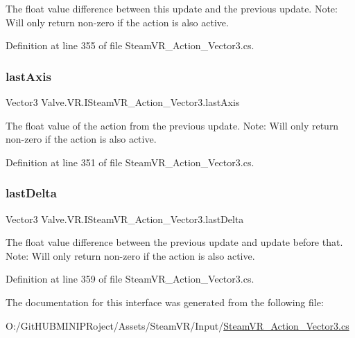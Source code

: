 The float value difference between this update and the previous update. Note\+: Will only return non-\/zero if the action is also active. 



Definition at line 355 of file Steam\+V\+R\+\_\+\+Action\+\_\+\+Vector3.\+cs.

\mbox{\label{interface_valve_1_1_v_r_1_1_i_steam_v_r___action___vector3_a9d3a8788967b30126be9b9482c4ded5f}} 
\subsubsection{\texorpdfstring{lastAxis}{lastAxis}}
{\footnotesize\ttfamily Vector3 Valve.\+V\+R.\+I\+Steam\+V\+R\+\_\+\+Action\+\_\+\+Vector3.\+last\+Axis\hspace{0.3cm}{\ttfamily [get]}}



The float value of the action from the previous update. Note\+: Will only return non-\/zero if the action is also active. 



Definition at line 351 of file Steam\+V\+R\+\_\+\+Action\+\_\+\+Vector3.\+cs.

\mbox{\label{interface_valve_1_1_v_r_1_1_i_steam_v_r___action___vector3_a27dfb00ae648ac06a9c7c8510a6dcf25}} 
\subsubsection{\texorpdfstring{lastDelta}{lastDelta}}
{\footnotesize\ttfamily Vector3 Valve.\+V\+R.\+I\+Steam\+V\+R\+\_\+\+Action\+\_\+\+Vector3.\+last\+Delta\hspace{0.3cm}{\ttfamily [get]}}



The float value difference between the previous update and update before that. Note\+: Will only return non-\/zero if the action is also active. 



Definition at line 359 of file Steam\+V\+R\+\_\+\+Action\+\_\+\+Vector3.\+cs.



The documentation for this interface was generated from the following file\+:\begin{DoxyCompactItemize}
\item 
O\+:/\+Git\+H\+U\+B\+M\+I\+N\+I\+P\+Roject/\+Assets/\+Steam\+V\+R/\+Input/\mbox{\hyperlink{_steam_v_r___action___vector3_8cs}{Steam\+V\+R\+\_\+\+Action\+\_\+\+Vector3.\+cs}}\end{DoxyCompactItemize}
